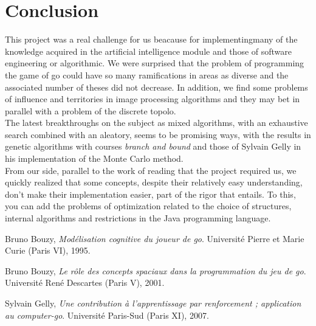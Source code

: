 \documentclass[a4paper,10pt,twoside]{report}
\begin{document}
\chapter{Conclusion}

	This project was a real challenge for us beacause for implementingmany of the knowledge acquired in the artificial intelligence module and those of software engineering or algorithmic. We were surprised that the problem of programming the game of go could have so many ramifications in areas as diverse and the associated number of theses did not decrease. In addition, we find some problems of influence and territories in image processing algorithms and they may bet in parallel with a problem of the discrete topolo.\\

	The latest breakthroughs on the subject as mixed algorithms, with an exhaustive search combined with an aleatory, seems to be promising ways, with the results in genetic algorithms with courses \emph{branch and bound} and those of Sylvain Gelly in his implementation of the Monte Carlo method.\\

	From our side, parallel to the work of reading that the project required us, we quickly realized that some concepts, despite their relatively easy understanding, don't make their implementation easier, part of the rigor that entails. To this, you can add the problems of optimization related to the choice of structures, internal algorithms and restrictions in the Java programming language.

\begin{thebibliography}{9}

	  Bruno Bouzy,
	  \emph{Modélisation cognitive du joueur de go}.
	  Université Pierre et Marie Curie (Paris VI),
	  1995.

	  Bruno Bouzy,
	  \emph{Le rôle des concepts spaciaux dans la programmation du jeu de go}.
	  Université René Descartes (Paris V),
	  2001.

	  Sylvain Gelly,
	  \emph{Une contribution à l'apprentissage par renforcement ; application au computer-go}.
	  Université Paris-Sud (Paris XI),
	  2007.

\end{thebibliography}
\end{document}
